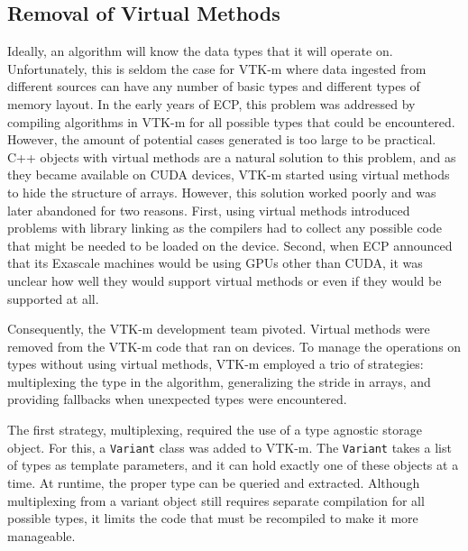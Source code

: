 

\subsection{Removal of Virtual Methods}


Ideally, an algorithm
will know the data types that it will operate on.
Unfortunately, this is seldom the case for VTK-m where data ingested from different sources can have any number of basic types
and different types of memory layout.
In the early years of ECP, this problem was addressed by compiling algorithms in VTK-m for all possible types that could be encountered.
However, the amount of potential cases generated is too large to be practical.
C++ objects with virtual methods are a natural solution to this problem, and as they became available on CUDA devices, VTK-m started using virtual methods to hide the structure of arrays.
However, this solution worked poorly and was later abandoned for two reasons.
First, using virtual methods introduced problems with library linking as the compilers had to collect any possible code that might be needed to be loaded on the device.
Second, when ECP announced that its Exascale machines would be using GPUs other than CUDA, it was unclear how well they would support virtual methods or even if they would be supported at all.

Consequently, the VTK-m development team pivoted.
Virtual methods were removed from the VTK-m code that ran on devices.
To manage the operations on types without using virtual methods, VTK-m employed a trio of strategies: multiplexing the type in the algorithm, generalizing the stride in arrays, and providing fallbacks when unexpected types were encountered.

The first strategy, multiplexing, required the use of a type agnostic storage object.
For this, a \texttt{Variant} class was added to VTK-m.
The \texttt{Variant} takes a list of types as template parameters, and it can hold exactly one of these objects at a time.
At runtime, the proper type can be queried and extracted.
Although multiplexing from a variant object still requires separate compilation for all possible types, it limits the code that must be recompiled to make it more manageable.

